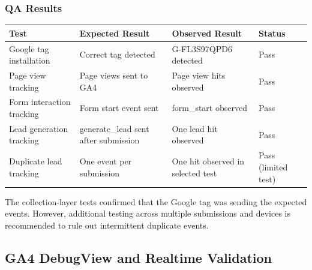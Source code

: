 \documentclass[
  letterpaper,
  DIV=11,
  numbers=noendperiod]{scrartcl}
\newcounter{none} %
\begin{document}
\subsubsection{QA Results}\label{qa-results}

{\def\LTcaptype{none} %
\begin{longtable}[]{@{}
  >{\raggedright\arraybackslash}p{}
  >{\raggedright\arraybackslash}p{}
  >{\raggedright\arraybackslash}p{}
  >{\raggedright\arraybackslash}p{}@{}}
\toprule\noalign{}
\begin{minipage}[b]{\linewidth}\raggedright
Test
\end{minipage} & \begin{minipage}[b]{\linewidth}\raggedright
Expected Result
\end{minipage} & \begin{minipage}[b]{\linewidth}\raggedright
Observed Result
\end{minipage} & \begin{minipage}[b]{\linewidth}\raggedright
Status
\end{minipage} \\
\midrule\noalign{}
\endhead
\bottomrule\noalign{}
\endlastfoot
Google tag installation & Correct tag detected & G-FL3S97QPD6 detected &
Pass \\
Page view tracking & Page views sent to GA4 & Page view hits observed &
Pass \\
Form interaction tracking & Form start event sent & form\_start observed
& Pass \\
Lead generation tracking & generate\_lead sent after submission & One
lead hit observed & Pass \\
Duplicate lead tracking & One event per submission & One hit observed in
selected test & Pass (limited test) \\
\end{longtable}
}

The collection-layer tests confirmed that the Google tag was sending the
expected events. However, additional testing across multiple submissions
and devices is recommended to rule out intermittent duplicate events.

\subsection{GA4 DebugView and Realtime
Validation}\label{ga4-debugview-and-realtime-validation}
\end{document}
